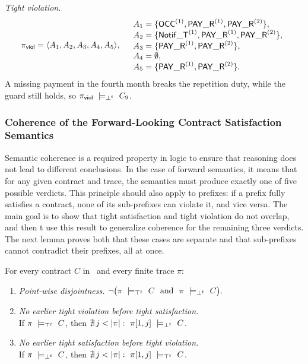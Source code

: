 \begin{example}
\emph{Tight violation.}
\[
\pi_{\mathsf{viol}}=
\langle
A_1,A_2,A_3,A_4,A_5
\rangle,
\quad
\begin{array}{l}
A_1=\{\mathsf{OCC}^{(1)},\mathsf{PAY\_R}^{(1)},\mathsf{PAY\_R}^{(2)}\},\\
A_2=\{\mathsf{Notif\_T}^{(1)},\mathsf{PAY\_R}^{(1)},\mathsf{PAY\_R}^{(2)}\},\\
A_3=\{\mathsf{PAY\_R}^{(1)},\mathsf{PAY\_R}^{(2)}\},\\
A_4=\emptyset,\\
A_5=\{\mathsf{PAY\_R}^{(1)},\mathsf{PAY\_R}^{(2)}\}.
\end{array}
\]
A missing payment in the fourth month breaks the repetition duty,
while the guard still holds, so
$\pi_{\mathsf{viol}}\ \models_{\bot^t}\ C_9$.
\end{example}

\subsubsection*{Coherence of the Forward-Looking Contract Satisfaction Semantics}

Semantic coherence is a required property in logic to ensure that reasoning does not lead to different conclusions. In the case of forward semantics, it means that for any given contract and trace, the semantics must produce exactly one of five possible verdicts. This principle should also apply to prefixes: if a prefix fully satisfies a contract, none of its sub-prefixes can violate it, and vice versa. The main goal is to show that tight satisfaction and tight violation do not overlap, and then t use this result to generalize coherence for the remaining three verdicts. The next lemma proves both that these cases are separate and that sub-prefixes cannot contradict their prefixes, all at once.

\begin{lemma}
\label{lem:mutual prefix}
For every contract $C$ in \cDL\ and every finite trace $\pi$:
\begin{enumerate}
\item \emph{Point-wise disjointness.}
$\neg\bigl(\pi\ \satt\ C\ \nd\ \pi\ \violt\ C\bigr).$

\item \emph{No earlier tight violation before tight satisfaction.}\\[2pt]
If $\pi\ \models_{\top^t}\ C$, then $\nexists\,j<|\pi|:\ \pi[1,j]\ \violt\ C$.

\item \emph{No earlier tight satisfaction before tight violation.}\\[2pt]
If $\pi\ \models_{\bot^t}\ C$, then $\nexists\,j<|\pi|:\ \pi[1,j]\ \satt\ C$.
\end{enumerate}
\end{lemma}

